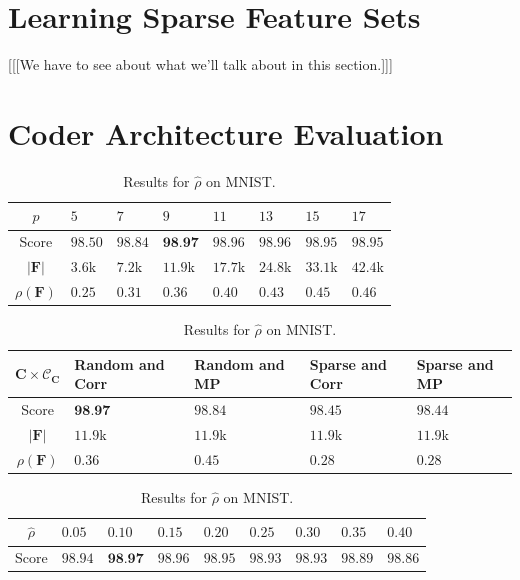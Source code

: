 \documentclass[12pt,a4paper,oneside,english]{UPBThesis}
\newcommand{\hctimes}[2]{{#1}\!\times\!{#2}}
\begin{document}
\section{Learning Sparse Feature Sets}
\label{sec:LearningSparseFeatureSet}

[[[We have to see about what we'll talk about in this section.]]]

\section{Coder Architecture Evaluation}
\label{sec:CoderArchitectureEvaluation}

\renewcommand{\arraystretch}{1.2}
\begin{table}
  \caption{Results for $p$ on MNIST.}
  \label{table:RecoderEvMNISTp}
  \begin{tabularx}{\textwidth}{|c|RRRRRRR|}
    \hline
    $p$ & $5$ & $7$ & $9$ & $11$ & $13$ & $15$ & $17$ \tabularnewline\hline\hline
    Score & $98.50$ & $98.84$ & $\textbf{98.97}$ & $98.96$ & $98.96$ & $98.95$ & $98.95$ \tabularnewline
    $\left|\textbf{F}\right|$ & $3.6$k & $7.2$k & $11.9$k & $17.7$k & $24.8$k & $33.1$k & $42.4$k \tabularnewline
    $\rho(\textbf{F})$ & $0.25$ & $0.31$ & $0.36$ & $0.40$ & $0.43$ & $0.45$ & $0.46$ \tabularnewline
    \hline
  \end{tabularx}
  \caption{Results for $\hctimes{\textbf{C}}{\mathcal{C}_{\textbf{C}}}$ on MNIST.}
  \label{table:RecoderEvMNISTCCC}
  \begin{tabularx}{\textwidth}{|c|RRRR|}
    \hline
    $\hctimes{\textbf{C}}{\mathcal{C}_{\textbf{C}}}$ & Random and \textbf{Corr} & Random and \textbf{MP} & Sparse and \textbf{Corr} & Sparse and \textbf{MP} \tabularnewline\hline\hline
    Score & $\textbf{98.97}$ & $98.84$ & $98.45$ & $98.44$ \tabularnewline
    $\left|\textbf{F}\right|$ & $11.9$k & $11.9$k & $11.9$k & $11.9$k \tabularnewline
    $\rho(\textbf{F})$ & $0.36$ & $0.45$ & $0.28$ & $0.28$ \tabularnewline
    \hline
  \end{tabularx}
  \caption{Results for $\hat{\rho}$ on MNIST.}
  \label{table:RecoderEvMNISTrho}
  \begin{tabularx}{\textwidth}{|c|RRRRRRRR|}
    \hline
    $\hat{\rho}$ & $0.05$ & $0.10$ & $0.15$ & $0.20$ & $0.25$ & $0.30$ & $0.35$ & $0.40$ \tabularnewline\hline\hline
    Score & $98.94$ & $\textbf{98.97}$ & $98.96$ & $98.95$ & $98.93$ & $98.93$ & $98.89$ & $98.86$ \tabularnewline

\end{tabularx}
\end{table}
\end{document}
